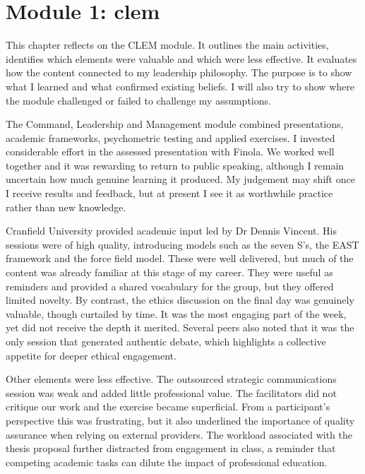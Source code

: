 \chapter{Module 1: \gls{clem}}

This chapter reflects on the CLEM module. It outlines the main activities, identifies which elements were valuable and which were less effective. It evaluates how the content connected to my leadership philosophy. The purpose is to show what I learned and what confirmed existing beliefs. I will also try to show where the module challenged or failed to challenge my assumptions.

The Command, Leadership and Management module combined presentations, academic frameworks, psychometric testing and applied exercises. I invested considerable effort in the assessed presentation with Finola. We worked well together and it was rewarding to return to public speaking, although I remain uncertain how much genuine learning it produced. My judgement may shift once I receive results and feedback, but at present I see it as worthwhile practice rather than new knowledge.  

Cranfield University provided academic input led by Dr Dennis Vincent. His sessions were of high quality, introducing models such as the seven S’s, the EAST framework and the force field model. These were well delivered, but much of the content was already familiar at this stage of my career. They were useful as reminders and provided a shared vocabulary for the group, but they offered limited novelty. By contrast, the ethics discussion on the final day was genuinely valuable, though curtailed by time. It was the most engaging part of the week, yet did not receive the depth it merited. Several peers also noted that it was the only session that generated authentic debate, which highlights a collective appetite for deeper ethical engagement.  

Other elements were less effective. The outsourced strategic communications session was weak and added little professional value. The facilitators did not critique our work and the exercise became superficial. From a participant’s perspective this was frustrating, but it also underlined the importance of quality assurance when relying on external providers. The workload associated with the thesis proposal further distracted from engagement in class, a reminder that competing academic tasks can dilute the impact of professional education.  

